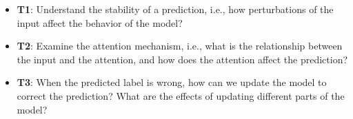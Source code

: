 \begin{itemize}

\item \textbf{T1}: Understand the stability of a prediction, i.e., how perturbations of the input affect the behavior of the model?

\item \textbf{T2}: Examine the attention mechanism, i.e., what is the relationship between the input and the attention, and how does the attention affect the prediction?

\item \textbf{T3}: When the predicted label is wrong, how can we update the model to correct the prediction? What are the effects of updating different parts of the model?




\end{itemize}


